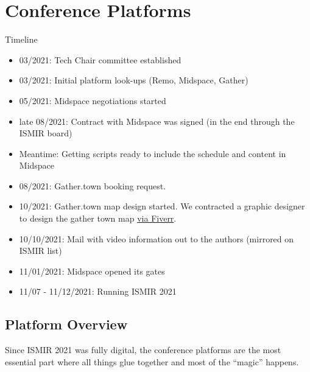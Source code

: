 \documentclass[%
10pt,								%
titlepage,						%
]
{scrartcl}
\begin{document}
\section{Conference Platforms}

Timeline
\begin{itemize}
    \item 03/2021: Tech Chair committee established
    \item 03/2021: Initial platform look-ups (Remo, Midspace, Gather)
    \item 05/2021: Midspace negotiations started
    \item late 08/2021: Contract with Midspace was signed (in the end through the ISMIR board)
    \item Meantime: Getting scripts ready to include the schedule and content in Midspace
    \item 08/2021: Gather.town booking request.
    \item 10/2021: Gather.town map design started. We contracted a graphic designer to design the gather town map \href{https://www.fiverr.com/jc_shay/create-and-customize-your-gather-town-space-for-you}{via Fiverr}.
    \item 10/10/2021: Mail with video information out to the authors (mirrored on ISMIR list)
    \item 11/01/2021: Midspace opened its gates
    \item 11/07 - 11/12/2021: Running ISMIR 2021
\end{itemize}

\subsection{Platform Overview}

Since ISMIR 2021 was fully digital, the conference platforms are the most essential part where all things glue together and most of the ``magic'' happens.
\end{document}
